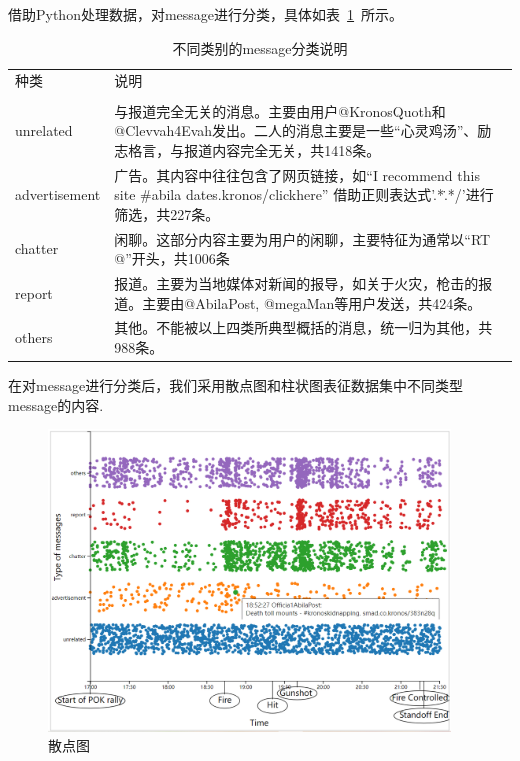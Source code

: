 \documentclass[a4paper]{article}
\begin{document}
借助Python处理数据，对message进行分类，具体如表~\ref{tab:table1}~所示。
\begin{table}[H]
  \caption{不同类别的message分类说明}\label{tab:table1}
  \vspace{0.5em}\centering
  \begin{tabular}{|p{2.2cm}<{\raggedright}|p{8.5cm}<{\raggedright}|}
    \toprule[1.5pt]
    种类          & 说明                                                                                                                                      \\                                                                                                                               \\
    \midrule[1pt]
    unrelated     & 与报道完全无关的消息。主要由用户@KronosQuoth和@Clevvah4Evah发出。二人的消息主要是一些“心灵鸡汤”、励志格言，与报道内容完全无关，共1418条。 \\ \hline
    advertisement & 广告。其内容中往往包含了网页链接，如“I recommend this site \#abila dates.kronos/clickhere” 借助正则表达式'.*\..*/'进行筛选，共227条。      \\ \hline
    chatter       & 闲聊。这部分内容主要为用户的闲聊，主要特征为通常以“RT @”开头，共1006条                                                                    \\ \hline
    report        & 报道。主要为当地媒体对新闻的报导，如关于火灾，枪击的报道。主要由@AbilaPost, @megaMan等用户发送，共424条。                                 \\ \hline
    others        & 其他。不能被以上四类所典型概括的消息，统一归为其他，共988条。                                                                             \\ \hline
    \bottomrule[1.5pt]
  \end{tabular}
  \vspace{\baselineskip}
\end{table}
在对message进行分类后，我们采用散点图和柱状图表征数据集中不同类型message的内容.
\begin{figure}[H]
  \centering
  \includegraphics[width=0.95\textwidth]{images/1-scatter-2.png}
  \caption{散点图}\label{fig:1-scatter}
  \vspace{\baselineskip}
\end{figure}
\end{document}
